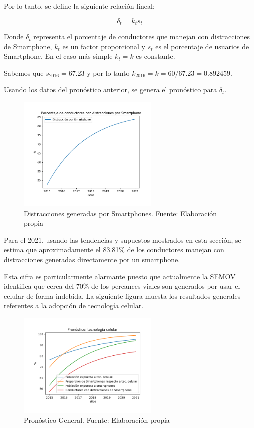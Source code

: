 \documentclass{article}
\begin{document}
Por lo tanto, se define la siguiente relación lineal:

\begin{equation}
\delta_t = k_t s_t
\end{equation}

Donde $\delta_t$ representa el porcentaje de conductores que manejan con distracciones de Smartphone,
$k_t$ es un factor proporcional y $s_t$ es el porcentaje de usuarios de Smartphone. En el caso más
simple $k_t = k$ es constante.


Sabemos que $s_{2016} = 67.23$ y por lo tanto $k_{2016} = k = 60/67.23 = 0.892459$.

Usando los datos del pronóstico anterior, se genera el pronóstico para $\delta_t$.

	\begin{figure}[H]\centering
	\includegraphics[width=0.6\textwidth]{resources/img/distraction.png}
	\caption{\label{fig:distr} Distracciones generadas por Smartphones. Fuente: Elaboración propia}
    \end{figure}

Para el 2021, usando las tendencias y supuestos mostrados en esta sección, se estima
que aproximadamente el 83.81\% de los conductores manejan con distracciones generadas
directamente por un smartphone.

Esta cifra es particularmente alarmante puesto que actualmente la SEMOV identifica
que cerca del 70\% de los percances viales son generados por usar el celular de
forma indebida. La siguiente figura muesta los resultados generales referentes a la adopción de
tecnología celular.

	\begin{figure}[H]\centering
	\includegraphics[width=0.6\textwidth]{resources/img/smartphone_complete_forecast.png}
	\caption{\label{fig:compare_forecast} Pronóstico General. Fuente: Elaboración propia}
    \end{figure}
\end{document}
